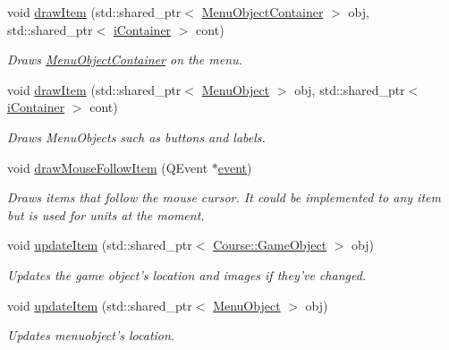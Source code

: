 \begin{DoxyCompactItemize}
void \hyperlink{class_student_1_1_game_scene_acc706c5bb651e371df81415ca96cb810}{draw\-Item} (std\-::shared\-\_\-ptr$<$ \hyperlink{class_student_1_1_menu_object_container}{Menu\-Object\-Container} $>$ obj, std\-::shared\-\_\-ptr$<$ \hyperlink{class_student_1_1i_container}{i\-Container} $>$ cont)
\begin{DoxyCompactList}\small\item\em Draws \hyperlink{class_student_1_1_menu_object_container}{Menu\-Object\-Container} on the menu. \end{DoxyCompactList}\item 
void \hyperlink{class_student_1_1_game_scene_ae189662aa849d3dec3b1a503b079e7e7}{draw\-Item} (std\-::shared\-\_\-ptr$<$ \hyperlink{class_student_1_1_menu_object}{Menu\-Object} $>$ obj, std\-::shared\-\_\-ptr$<$ \hyperlink{class_student_1_1i_container}{i\-Container} $>$ cont)
\begin{DoxyCompactList}\small\item\em Draws Menu\-Objects such as buttons and labels. \end{DoxyCompactList}\item 
void \hyperlink{class_student_1_1_game_scene_a88826868f44ca25fddd09b9dab54d225}{draw\-Mouse\-Follow\-Item} (Q\-Event $\ast$\hyperlink{class_student_1_1_game_scene_a60a33d6cd4e3c40979e50b665d8cb024}{event})
\begin{DoxyCompactList}\small\item\em Draws items that follow the mouse cursor. It could be implemented to any item but is used for units at the moment. \end{DoxyCompactList}\item 
void \hyperlink{class_student_1_1_game_scene_acad27d95730599e6d80b04be32807d2f}{update\-Item} (std\-::shared\-\_\-ptr$<$ \hyperlink{class_course_1_1_game_object}{Course\-::\-Game\-Object} $>$ obj)
\begin{DoxyCompactList}\small\item\em Updates the game object's location and images if they've changed. \end{DoxyCompactList}\item 
void \hyperlink{class_student_1_1_game_scene_acb7e3b120df9bd94fcbdf6fe140e643f}{update\-Item} (std\-::shared\-\_\-ptr$<$ \hyperlink{class_student_1_1_menu_object}{Menu\-Object} $>$ obj)
\begin{DoxyCompactList}\small\item\em Updates menuobject's location. \end{DoxyCompactList}\item 

\end{DoxyCompactItemize}
